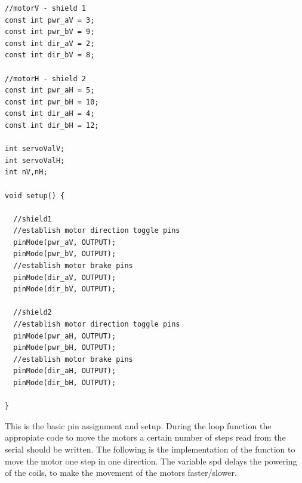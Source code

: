 \documentclass[a4paper,10pt]{article}
\begin{document}
\begin{lstlisting}
//motorV - shield 1
const int pwr_aV = 3;
const int pwr_bV = 9;
const int dir_aV = 2;
const int dir_bV = 8;

//motorH - shield 2
const int pwr_aH = 5;
const int pwr_bH = 10;
const int dir_aH = 4;
const int dir_bH = 12;

int servoValV;           
int servoValH;
int nV,nH;

void setup() {
  
  //shield1
  //establish motor direction toggle pins
  pinMode(pwr_aV, OUTPUT); 
  pinMode(pwr_bV, OUTPUT); 
  //establish motor brake pins
  pinMode(dir_aV, OUTPUT); 
  pinMode(dir_bV, OUTPUT); 

  //shield2
  //establish motor direction toggle pins
  pinMode(pwr_aH, OUTPUT); 
  pinMode(pwr_bH, OUTPUT); 
  //establish motor brake pins
  pinMode(dir_aH, OUTPUT); 
  pinMode(dir_bH, OUTPUT); 
  
}

\end{lstlisting}

This is the basic pin assignment and setup. During the loop function the appropiate code to move the motors a certain number of steps read from the serial should be written.
The following is the implementation of the function to move the motor one step in one direction. The variable spd delays the powering of the coils, to make
the movement of the motors faster/slower.
\end{document}
